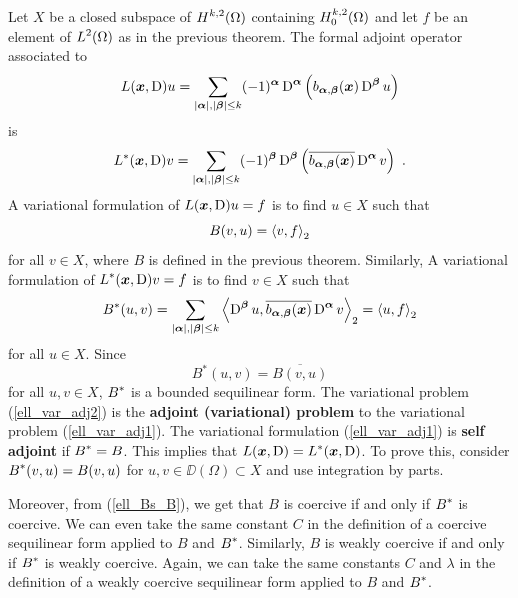 Let $X$ be a closed subspace of $\displaystyle H^{k,2}(\Omega)$ containing
$\displaystyle H^{k,2}_0(\Omega)$ and let $f$ be an element of
$\displaystyle L^2(\Omega)$ as in
the previous theorem.  The formal adjoint operator associated to
\[
L({\bm{x}},\operatorname{D})u = \sum_{|{\bm{\alpha}}|,|{\bm{\beta}}|\leq k}
(-1)^{{\bm{\alpha}}} \operatorname{D}^{{\bm{\alpha}}}
\left( b_{{\bm{\alpha}},{\bm{\beta}}}({\bm{x}}) \operatorname{D}^{{\bm{\beta}}} u\right)
\]
is
\[
L^\ast({\bm{x}},\operatorname{D})v = \sum_{|{\bm{\alpha}}|,|{\bm{\beta}}|\leq k}
(-1)^{{\bm{\beta}}} \operatorname{D}^{{\bm{\beta}}}
\left( \overline{b_{{\bm{\alpha}},{\bm{\beta}}}({\bm{x}})}
\operatorname{D}^{{\bm{\alpha}}} v\right) \  .
\]
A variational formulation of $L({\bm{x}},\operatorname{D})u = f$ is to find
$u\in X$ such that
\begin{equation} \label{ell_var_adj1}
B(v,u) = \left\langle{v} , {f}\right\rangle_2
\end{equation}
for all $v \in X$, where $B$ is defined in the previous theorem.  Similarly, A
variational formulation of $\displaystyle L^\ast({\bm{x}},\operatorname{D})v = f$
is to find $v\in X$ such that
\begin{equation} \label{ell_var_adj2}
B^\ast(u,v) = \sum_{|{\bm{\alpha}}|,|{\bm{\beta}}|\leq k} 
\left\langle{\operatorname{D}^{{\bm{\beta}}} u} , {\overline{b_{{\bm{\alpha}},{\bm{\beta}}}({\bm{x}})}
\operatorname{D}^{{\bm{\alpha}}} v}\right\rangle_2 = \left\langle{u} , {f}\right\rangle_2
\end{equation}
for all $u \in X$.  Since
\begin{equation} \label{ell_Bs_B}
B^\ast(u,v) = \overline{B(v,u)}
\end{equation}
for all $u,v \in X$,
$\displaystyle B^\ast$ is a bounded sequilinear form. The variational problem
(\ref{ell_var_adj2}) is the {\bfseries adjoint (variational) problem}
to the variational problem (\ref{ell_var_adj1}).  The variational
formulation (\ref{ell_var_adj1}) is {\bfseries self adjoint}
 if
$\displaystyle B^\ast=B$.  This implies that
$\displaystyle L({\bm{x}},\operatorname{D})=L^\ast({\bm{x}},\operatorname{D})$.  To
prove this, consider $\displaystyle B^\ast(v,u) = B(v,u)$ for
$u,v \in \DD(\Omega) \subset X$ and use integration by parts.

Moreover, from (\ref{ell_Bs_B}), we get that $B$ is coercive
if and only if $\displaystyle B^\ast$ is coercive.  We can even take the same
constant $C$ in the definition of a coercive sequilinear form applied
to $B$ and $\displaystyle B^\ast$.  Similarly, $B$ is weakly coercive
if and only if $\displaystyle B^\ast$ is weakly coercive.  Again, we
can take the same constants $C$ and $\lambda$ in the definition of a
weakly coercive sequilinear form applied to $B$ and $\displaystyle B^\ast$.

